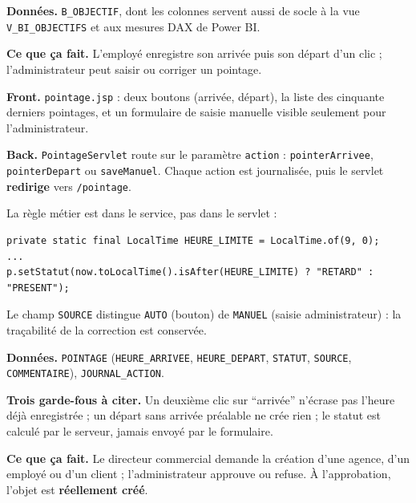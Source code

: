 \textbf{Données.} \texttt{B\_OBJECTIF}, dont les colonnes servent aussi de
socle à la vue \texttt{V\_BI\_OBJECTIFS} et aux mesures DAX de Power BI.


\textbf{Ce que ça fait.} L'employé enregistre son arrivée puis son départ d'un
clic ; l'administrateur peut saisir ou corriger un pointage.

\textbf{Front.} \texttt{pointage.jsp} : deux boutons (arrivée, départ), la
liste des cinquante derniers pointages, et un formulaire de saisie manuelle
visible seulement pour l'administrateur.

\textbf{Back.} \texttt{PointageServlet} route sur le paramètre
\texttt{action} : \texttt{pointerArrivee}, \texttt{pointerDepart} ou
\texttt{saveManuel}. Chaque action est journalisée, puis le servlet
\textbf{redirige} vers \texttt{/pointage}.

La règle métier est dans le service, pas dans le servlet :

\begin{lstlisting}[style=java]
private static final LocalTime HEURE_LIMITE = LocalTime.of(9, 0);
...
p.setStatut(now.toLocalTime().isAfter(HEURE_LIMITE) ? "RETARD" : "PRESENT");
\end{lstlisting}

Le champ \texttt{SOURCE} distingue \texttt{AUTO} (bouton) de \texttt{MANUEL}
(saisie administrateur) : la traçabilité de la correction est conservée.

\textbf{Données.} \texttt{POINTAGE} (\texttt{HEURE\_ARRIVEE},
\texttt{HEURE\_DEPART}, \texttt{STATUT}, \texttt{SOURCE},
\texttt{COMMENTAIRE}), \texttt{JOURNAL\_ACTION}.

\begin{retenir}
\textbf{Trois garde-fous à citer.} Un deuxième clic sur \enquote{arrivée}
n'écrase pas l'heure déjà enregistrée ; un départ sans arrivée préalable ne
crée rien ; le statut est calculé par le serveur, jamais envoyé par le
formulaire.
\end{retenir}


\textbf{Ce que ça fait.} Le directeur commercial demande la création d'une
agence, d'un employé ou d'un client ; l'administrateur approuve ou refuse. À
l'approbation, l'objet est \textbf{réellement créé}.

